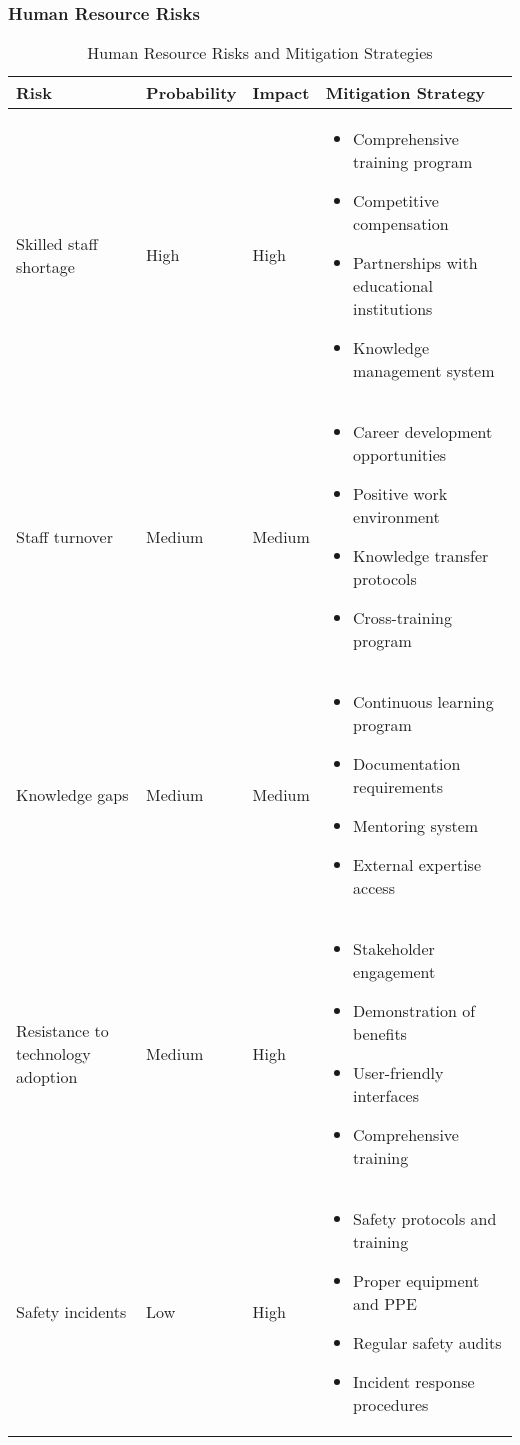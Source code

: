 \subsubsection{Human Resource Risks}
\begin{table}[H]
\centering
\begin{tabular}{|p{3cm}|p{2cm}|p{2cm}|p{7cm}|}
\hline
\textbf{Risk} & \textbf{Probability} & \textbf{Impact} & \textbf{Mitigation Strategy} \\
\hline
Skilled staff shortage & High & High & 
\begin{itemize}
    \item Comprehensive training program
    \item Competitive compensation
    \item Partnerships with educational institutions
    \item Knowledge management system
\end{itemize} \\
\hline
Staff turnover & Medium & Medium & 
\begin{itemize}
    \item Career development opportunities
    \item Positive work environment
    \item Knowledge transfer protocols
    \item Cross-training program
\end{itemize} \\
\hline
Knowledge gaps & Medium & Medium & 
\begin{itemize}
    \item Continuous learning program
    \item Documentation requirements
    \item Mentoring system
    \item External expertise access
\end{itemize} \\
\hline
Resistance to technology adoption & Medium & High & 
\begin{itemize}
    \item Stakeholder engagement
    \item Demonstration of benefits
    \item User-friendly interfaces
    \item Comprehensive training
\end{itemize} \\
\hline
Safety incidents & Low & High & 
\begin{itemize}
    \item Safety protocols and training
    \item Proper equipment and PPE
    \item Regular safety audits
    \item Incident response procedures
\end{itemize} \\
\hline
\end{tabular}
\caption{Human Resource Risks and Mitigation Strategies}
\end{table}

